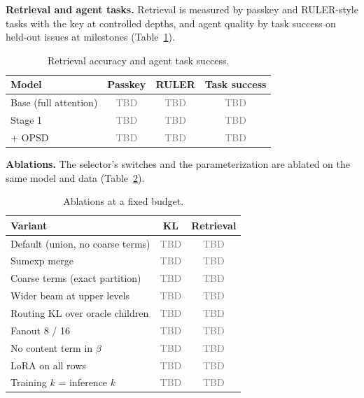 \documentclass[10pt,twocolumn]{article}
\newcommand{\para}[1]{\noindent\textbf{#1}\hspace{0.5em}}
\newcommand{\tbd}{\textcolor{gray}{TBD}}
\begin{document}
\para{Retrieval and agent tasks.}
Retrieval is measured by passkey and RULER-style \citep{hsieh2024ruler} tasks with the key at
controlled depths, and agent quality by task success on held-out issues at milestones
(Table~\ref{tab:tasks}).

\begin{table}[t]
\caption{Retrieval accuracy and agent task success.}
\label{tab:tasks}
\centering\small
\begin{tabular}{lccc}
\toprule
Model & Passkey & RULER & Task success \\
\midrule
Base (full attention) & \tbd & \tbd & \tbd \\
Stage 1 & \tbd & \tbd & \tbd \\
+ OPSD & \tbd & \tbd & \tbd \\
\bottomrule
\end{tabular}
\end{table}

\para{Ablations.}
The selector's switches and the parameterization are ablated on the same model and data
(Table~\ref{tab:ablation}).

\begin{table}[t]
\caption{Ablations at a fixed budget.}
\label{tab:ablation}
\centering\small
\begin{tabular}{lcc}
\toprule
Variant & KL & Retrieval \\
\midrule
Default (union, no coarse terms) & \tbd & \tbd \\
Sumexp merge & \tbd & \tbd \\
Coarse terms (exact partition) & \tbd & \tbd \\
Wider beam at upper levels & \tbd & \tbd \\
Routing KL over oracle children & \tbd & \tbd \\
Fanout 8 / 16 & \tbd & \tbd \\
No content term in $\beta$ & \tbd & \tbd \\
LoRA on all rows & \tbd & \tbd \\
Training $k$ = inference $k$ & \tbd & \tbd \\
\bottomrule
\end{tabular}
\end{table}
\end{document}

